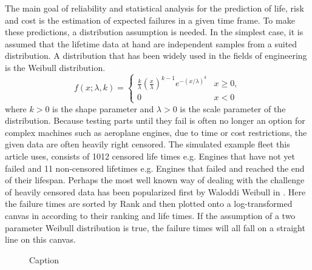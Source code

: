 The main goal of reliability and statistical analysis for the prediction of life, risk and cost is the estimation of expected failures in a given time frame. To make these predictions, a distribution assumption is needed. In the simplest case, it is assumed that the lifetime data at hand are independent samples from a suited distribution. A distribution that has been widely used in the fields of engineering is the Weibull distribution. 
\begin{equation}
f(x;\lambda ,k)={\begin{cases}{\frac {k}{\lambda }}\left({\frac {x}{\lambda }}\right)^{k-1}e^{-(x/\lambda )^{k}}&x\geq 0, \\ 0&x<0\end{cases}}
\end{equation}
where $k > 0$ is the shape parameter and $\lambda > 0$ is the scale parameter of the distribution. Because testing parts until they fail is often no longer an option for complex machines such as aeroplane engines, due to time or cost restrictions, the given data are often heavily right censored. The simulated example fleet this article uses, consists of 1012 censored life times e.g. Engines that have not yet failed and 11 non-censored lifetimes e.g. Engines that failed and reached the end of their lifespan. Perhaps the most well known way of dealing with the challenge of heavily censored data has been popularized first by Waloddi Weibull in \cite{waloddiweibull}. Here the failure times are sorted by Rank and then plotted onto a log-transformed canvas in according to their ranking and life times. If the assumption of a two parameter Weibull distribution is true, the failure times will all fall on a straight line on this canvas. 
\begin{figure}
    \centering
    \caption{Caption}
    \label{fig:weibullfit}
\end{figure}

